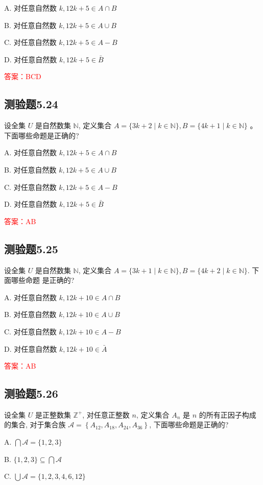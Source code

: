 \documentclass[UTF8, heading=true]{ctexart}
\begin{document}
A. 对任意自然数 $k, 12 k+5 \in A \cap B$

B. 对任意自然数 $k, 12 k+5 \in A \cup B$

C. 对任意自然数 $k, 12 k+5 \in A-B$

D. 对任意自然数 $k, 12 k+5 \in \bar{B}$

\textcolor{red}{答案：BCD}

\subsection{测验题5.24}

设全集 $U$ 是自然数集 $\mathbb{N}$, 定义集合 $A=\{3 k+2 \mid k \in \mathbb{N}\}, B=\{4 k+1 \mid k \in \mathbb{N}\}$ 。下面哪些命题是正确的?

A. 对任意自然数 $k, 12 k+5 \in A \cap B$

B. 对任意自然数 $k, 12 k+5 \in A \cup B$

C. 对任意自然数 $k, 12 k+5 \in A-B$

D. 对任意自然数 $k, 12 k+5 \in \bar{B}$

\textcolor{red}{答案：AB}

\subsection{测验题5.25}
设全集 $U$ 是自然数集 $\mathbb{N}$, 定义集合 $A=\{3 k+1 \mid k \in \mathbb{N}\}, B=\{4 k+2 \mid k \in \mathbb{N}\}$. 下面哪些命题
是正确的?

A. 对任意自然数 $k, 12 k+10 \in A \cap B$

B. 对任意自然数 $k, 12 k+10 \in A \cup B$

C. 对任意自然数 $k, 12 k+10 \in A-B$

D. 对任意自然数 $k, 12 k+10 \in \bar{A}$

\textcolor{red}{答案：AB}

\subsection{测验题5.26}

设全集 $U$ 是正整数集 $\mathbb{Z}^{+}$, 对任意正整数 $n$, 定义集合 $A_n$ 是 $n$ 的所有正因子构成的集合, 对于集合族 $\mathcal{A}=\left\{A_{12}, A_{18}, A_{24}, A_{36}\right\}$, 下面哪些命题是正确的?

A. $\bigcap \mathcal{A}=\{1,2,3\}$

B. $\{1,2,3\} \subseteq \bigcap \mathcal{A}$

C. $\bigcup \mathcal{A}=\{1,2,3,4,6,12\}$
\end{document}
